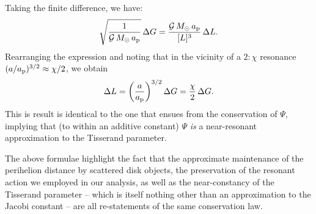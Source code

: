 \documentclass[twocolumn]{aastex62}
\newcommand{\G}{\mathcal{G}}
\newcommand{\Msun}{M_{\odot}}
\begin{document}
\begin{appendix}
Taking the finite difference, we have:
\begin{align}
\sqrt{\frac{1}{\G\,\Msun\,a_{\rm{p}}}}\,\Delta G=\frac{\G\,\Msun\,a_{\rm{p}}}{[L]^3}\,\Delta L.
\end{align}
Rearranging the expression and noting that in the vicinity of a $2:\chi$ resonance $(a/a_{\rm{p}})^{3/2}\approx\chi/2$, we obtain
\begin{align}
\Delta L=\bigg(\frac{a}{a_{\rm{p}}} \bigg)^{3/2}\, \Delta G = \frac{\chi}{2}\,\Delta G.
\end{align}
This is result is identical to the one that ensues from the conservation of $\Psi$, implying that (to within an additive constant) $\Psi$ \textit{is} a near-resonant approximation to the Tisserand parameter.

The above formulae highlight the fact that the approximate maintenance of the perihelion distance by scattered disk objects, the preservation of the resonant action we employed in our analysis, as well as the near-constancy of the Tisserand parameter -- which is itself nothing other than an approximation to the Jacobi constant -- are all re-statements of the same conservation law.

\end{appendix}
\end{document}
